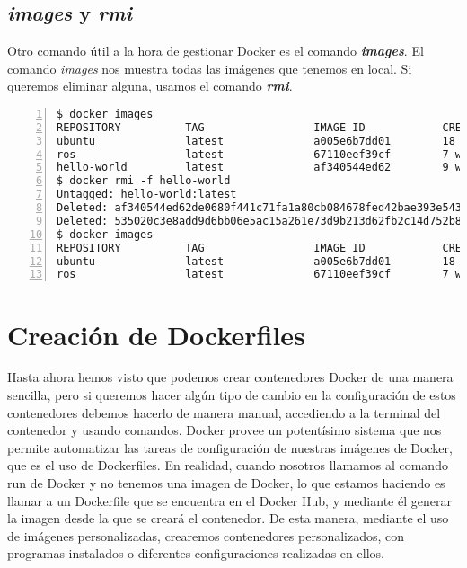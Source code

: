 	\subsection{\textit{images} y \textit{rmi}}
	Otro comando útil a la hora de gestionar Docker es el comando \textbf{\emph{images}}. El comando \textit{images} nos muestra todas las imágenes que tenemos en local. Si queremos eliminar alguna, usamos el comando \textbf{\emph{rmi}}.
	
	\begin{lstlisting}[style=consola,numbers=left]
$ docker images
REPOSITORY          TAG                 IMAGE ID            CREATED             VIRTUAL SIZE
ubuntu              latest              a005e6b7dd01        18 hours ago        188.4 MB
ros                 latest              67110eef39cf        7 weeks ago         826.7 MB
hello-world         latest              af340544ed62        9 weeks ago         960 B
$ docker rmi -f hello-world
Untagged: hello-world:latest
Deleted: af340544ed62de0680f441c71fa1a80cb084678fed42bae393e543faea3a572c
Deleted: 535020c3e8add9d6bb06e5ac15a261e73d9b213d62fb2c14d752b8e189b2b912
$ docker images
REPOSITORY          TAG                 IMAGE ID            CREATED             VIRTUAL SIZE
ubuntu              latest              a005e6b7dd01        18 hours ago        188.4 MB
ros                 latest              67110eef39cf        7 weeks ago         826.7 MB
	\end{lstlisting}
	
	\section{Creación de Dockerfiles}
	Hasta ahora hemos visto que podemos crear contenedores Docker de una manera sencilla, pero si queremos hacer algún tipo de cambio en la configuración de estos contenedores debemos hacerlo de manera manual, accediendo a la terminal del contenedor y usando comandos. Docker provee un potentísimo sistema que nos permite automatizar las tareas de configuración de nuestras imágenes de Docker, que es el uso de Dockerfiles. En realidad, cuando nosotros llamamos al comando run de Docker y no tenemos una imagen de Docker, lo que estamos haciendo es llamar a un Dockerfile que se encuentra en el Docker Hub, y mediante él generar la imagen desde la que se creará el contenedor. De esta manera, mediante el uso de imágenes personalizadas, crearemos contenedores personalizados, con programas instalados o diferentes configuraciones realizadas en ellos.
	
